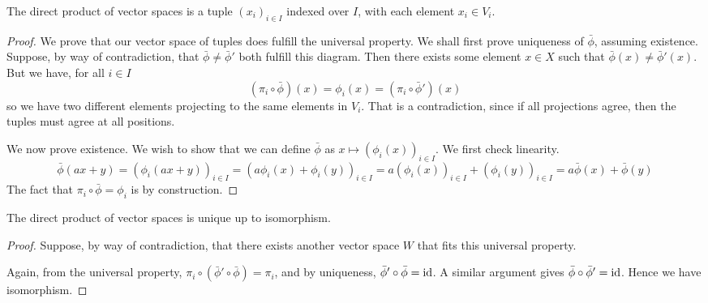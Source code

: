 \begin{theorem}
    The direct product of vector spaces is a tuple \({(x_i)}_{i \in I}\) indexed over \(I\),
    with each element \(x_i \in V_i\).
\end{theorem}
\begin{proof}
    We prove that our vector space of tuples does fulfill the universal property.
    We shall first prove uniqueness of \(\bar{\phi}\), assuming existence.
    Suppose, by way of contradiction,
    that \(\bar{\phi} \neq \bar{\phi}'\) both fulfill this diagram.
    Then there exists some element \(x \in X\) such that
    \(\bar{\phi}(x) \neq \bar{\phi}'(x)\).
    But we have, for all \(i \in I\)
    \begin{equation*}
        (\pi_i\circ\bar{\phi})(x) = \phi_i(x) = (\pi_i\circ\bar{\phi}')(x)
    \end{equation*}
    so we have two different elements projecting to the same elements in \(V_i\).
    That is a contradiction, since if all projections agree,
    then the tuples must agree at all positions.

    We now prove existence.
    We wish to show that we can define \(\bar{\phi}\) as
    \(x \mapsto {(\phi_i(x))}_{i \in I}\).
    We first check linearity.
    \begin{equation*}
        \bar{\phi}(ax + y) = {(\phi_i(ax+y))}_{i \in I}
        = {(a\phi_i(x) + \phi_i(y))}_{i \in I}
        = a{(\phi_i(x))}_{i \in I} + {(\phi_i(y))}_{i \in I}
        = a\bar{\phi}(x) + \bar{\phi}(y)
    \end{equation*}
    The fact that \(\pi_i\circ\bar{\phi} = \phi_i\) is by construction.
\end{proof}
\begin{theorem}
    The direct product of vector spaces is unique up to isomorphism.
\end{theorem}
\begin{proof}
    Suppose, by way of contradiction, that there exists another vector space \(W\)
    that fits this universal property.
    \begin{center}
    \end{center}
    Again, from the universal property,
    \(\pi_i\circ(\bar{\phi}'\circ\bar{\phi}) = \pi_i\),
    and by uniqueness, \(\bar{\phi}'\circ\bar{\phi} = \operatorname{id}\).
    A similar argument gives \(\bar{\phi}\circ\bar{\phi}' = \operatorname{id}\).
    Hence we have isomorphism.
\end{proof}

